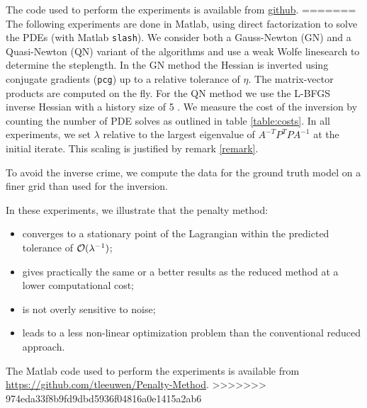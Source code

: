 \documentclass{iopart}
\begin{document}
{The code used to perform the experiments is available from \url{github}.
=======
The following experiments are done in Matlab, using direct factorization to solve the PDEs (with Matlab \texttt{slash}). We consider both a Gauss-Newton (GN) and a Quasi-Newton (QN) variant of the algorithms and use a weak Wolfe linesearch to determine the steplength. In the GN method the Hessian is inverted using conjugate gradients (\texttt{pcg}) up to a relative tolerance of $\eta$. The matrix-vector products are computed on the fly. For the QN method we use the L-BFGS inverse Hessian with a history size of 5 \cite{Nocedal}. We measure the cost of the inversion by counting the number of PDE solves as outlined in table \ref{table:costs}. In all experiments, we set $\lambda$ relative to the largest eigenvalue of $A^{-T}P^T\!PA^{-1}$ at the initial iterate. This scaling is justified by remark \ref{remark}.

To avoid the inverse crime, we compute the data for the ground truth model on a finer grid than used for the inversion. 

In these experiments, we illustrate that the penalty method: 
\begin{itemize}
\item converges to a stationary point of the Lagrangian within the predicted tolerance of $\mathcal{O}(\lambda^{-1})$;
\item gives practically the same or a better results as the reduced method at a lower computational cost;
\item is not overly sensitive to noise;
\item leads to a less non-linear optimization problem than the conventional reduced approach.
\end{itemize}
The Matlab code used to perform the experiments is available from \url{https://github.com/tleeuwen/Penalty-Method}.
>>>>>>> 974eda33f8b9fd9dbd5936f04816a0e1415a2ab6

}
\end{document}
